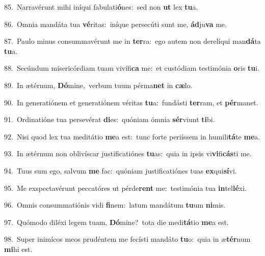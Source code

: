 {\numbfont\textcolor{\numbcolor}{85.}}~Narravérunt mihi iníqui fabulati\-\textbf{ó}\-nes:~\star sed non \textbf{ut} lex \textbf{tu}\-a.\par
{\numbfont\textcolor{\numbcolor}{86.}}~Omnia mandáta tua \textbf{vé}\-ritas:~\star iníque persecúti sunt me, \textbf{ád}\-ju\textbf{va} me.\par
{\numbfont\textcolor{\numbcolor}{87.}}~Paulo minus consummavérunt me in \textbf{ter}\-ra:~\star ego autem non derelíqui man\-\textbf{dá}\-ta \textbf{tu}\-a.\par
{\numbfont\textcolor{\numbcolor}{88.}}~Secúndum misericórdiam tuam vivífi\textbf{ca} me:~\star et custódiam testimónia \textbf{o}\-ris \textbf{tu}\-i.\par
{\numbfont\textcolor{\numbcolor}{89.}}~In ætérnum, \textbf{Dó}\-mine,~\star verbum tuum pérma\textbf{net} in \textbf{cæ}\-lo.\par
{\numbfont\textcolor{\numbcolor}{90.}}~In generatiónem et generatiónem véritas \textbf{tu}\-a:~\star fundásti \textbf{ter}\-ram, et \textbf{pér}\-manet.\par
{\numbfont\textcolor{\numbcolor}{91.}}~Ordinatióne tua persevérat \textbf{di}\-es:~\star quóniam ómnia \textbf{sér}\-viunt \textbf{ti}\-bi.\par
{\numbfont\textcolor{\numbcolor}{92.}}~Nisi quod lex tua meditátio \textbf{me}\-a est:~\star tunc forte periíssem in humili\-\textbf{tá}\-te \textbf{me}\-a.\par
{\numbfont\textcolor{\numbcolor}{93.}}~In ætérnum non oblivíscar justificatiónes \textbf{tu}\-as:~\star quia in ipsis vi\-\textbf{vi}\-fi\-\textbf{cás}\-ti me.\par
{\numbfont\textcolor{\numbcolor}{94.}}~Tuus sum ego, salvum \textbf{me} fac:~\star quóniam justificatiónes tuas \textbf{ex}\-qui\-\textbf{sí}\-vi.\par
{\numbfont\textcolor{\numbcolor}{95.}}~Me exspectavérunt peccatóres ut pérde\textbf{rent} me:~\star testimónia tua \textbf{in}\-tel\-\textbf{lé}\-xi.\par
{\numbfont\textcolor{\numbcolor}{96.}}~Omnis consummatiónis vidi \textbf{fi}\-nem:~\star latum mandátum \textbf{tu}\-um \textbf{ni}\-mis.\par
{\numbfont\textcolor{\numbcolor}{97.}}~Quómodo diléxi legem tuam, \textbf{Dó}\-mine?~\star tota die medi\-\textbf{tá}\-tio \textbf{me}\-a est.\par
{\numbfont\textcolor{\numbcolor}{98.}}~Super inimícos meos prudéntem me fecísti mandáto \textbf{tu}\-o:~\star quia in æ\-\textbf{tér}\-num \textbf{mi}\-hi est.\par

